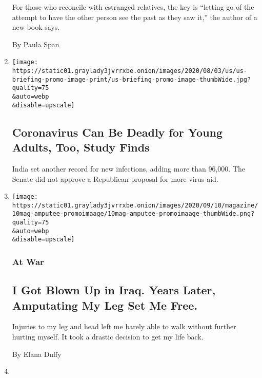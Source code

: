 \begin{enumerate}
  For those who reconcile with estranged relatives, the key is ``letting
  go of the attempt to have the other person see the past as they saw
  it,'' the author of a new book says.

  By Paula Span
\item
  \href{/2020/09/10/world/covid-19-coronavirus.html}{}

  \texttt{[image: https://static01.graylady3jvrrxbe.onion/images/2020/08/03/us/us-briefing-promo-image-print/us-briefing-promo-image-thumbWide.jpg?quality=75\\\&auto=webp\\\&disable=upscale]}

  \hypertarget{coronavirus-can-be-deadly-for-young-adults-too-study-finds}{%
  \subsection{Coronavirus Can Be Deadly for Young Adults, Too, Study
  Finds}\label{coronavirus-can-be-deadly-for-young-adults-too-study-finds}}

  India set another record for new infections, adding more than 96,000.
  The Senate did not approve a Republican proposal for more virus aid.
\item
  \href{/interactive/2020/09/10/magazine/amputation-implanted-prosthetic-limb-osseointegration.html}{}

  \texttt{[image: https://static01.graylady3jvrrxbe.onion/images/2020/09/10/magazine/10mag-amputee-promoimaage/10mag-amputee-promoimaage-thumbWide.png?quality=75\\\&auto=webp\\\&disable=upscale]}

  \hypertarget{at-war}{%
  \subsubsection{At War}\label{at-war}}

  \hypertarget{i-got-blown-up-in-iraq-years-later-amputating-my-leg-set-me-free}{%
  \subsection{I Got Blown Up in Iraq. Years Later, Amputating My Leg Set
  Me
  Free.}\label{i-got-blown-up-in-iraq-years-later-amputating-my-leg-set-me-free}}

  Injuries to my leg and head left me barely able to walk without
  further hurting myself. It took a drastic decision to get my life
  back.

  By Elana Duffy
\item
  \href{/2020/09/09/realestate/home-health-technology.html}{}


\end{enumerate}

